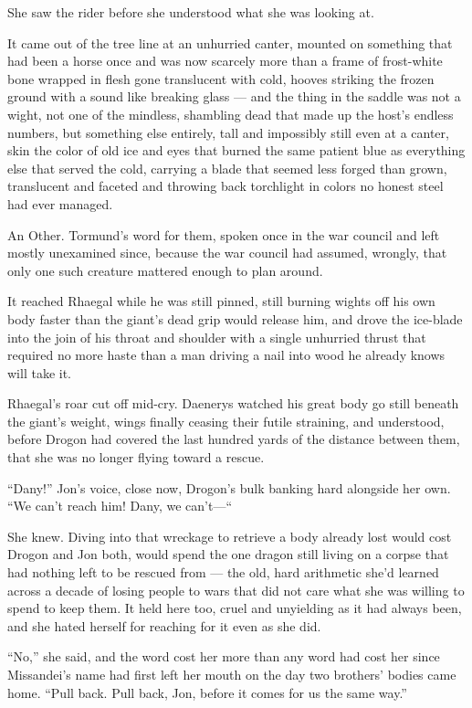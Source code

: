 She saw the rider before she understood what she was looking at.

It came out of the tree line at an unhurried canter, mounted on something that had been a horse once and was now scarcely more than a frame of frost-white bone wrapped in flesh gone translucent with cold, hooves striking the frozen ground with a sound like breaking glass — and the thing in the saddle was not a wight, not one of the mindless, shambling dead that made up the host’s endless numbers, but something else entirely, tall and impossibly still even at a canter, skin the color of old ice and eyes that burned the same patient blue as everything else that served the cold, carrying a blade that seemed less forged than grown, translucent and faceted and throwing back torchlight in colors no honest steel had ever managed.

An Other. Tormund’s word for them, spoken once in the war council and left mostly unexamined since, because the war council had assumed, wrongly, that only one such creature mattered enough to plan around.

It reached Rhaegal while he was still pinned, still burning wights off his own body faster than the giant’s dead grip would release him, and drove the ice-blade into the join of his throat and shoulder with a single unhurried thrust that required no more haste than a man driving a nail into wood he already knows will take it.

Rhaegal’s roar cut off mid-cry. Daenerys watched his great body go still beneath the giant’s weight, wings finally ceasing their futile straining, and understood, before Drogon had covered the last hundred yards of the distance between them, that she was no longer flying toward a rescue.

\sceneBreak

“Dany!” Jon’s voice, close now, Drogon’s bulk banking hard alongside her own. “We can’t reach him! Dany, we can’t—“

She knew. Diving into that wreckage to retrieve a body already lost would cost Drogon and Jon both, would spend the one dragon still living on a corpse that had nothing left to be rescued from — the old, hard arithmetic she’d learned across a decade of losing people to wars that did not care what she was willing to spend to keep them. It held here too, cruel and unyielding as it had always been, and she hated herself for reaching for it even as she did.

“No,” she said, and the word cost her more than any word had cost her since Missandei’s name had first left her mouth on the day two brothers’ bodies came home. “Pull back. Pull back, Jon, before it comes for us the same way.”

